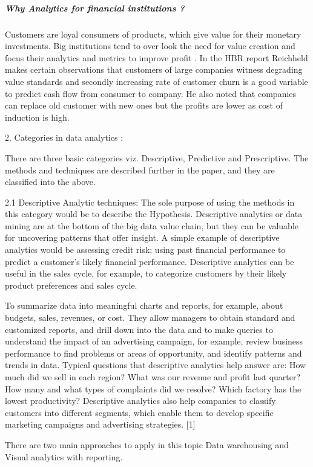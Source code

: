 \subparagraph{Why Analytics for financial institutions ?}
Customers are loyal consumers of products, which give value for their monetary investments. Big institutions tend to over look the need for value creation and focus their analytics and metrics to improve profit . In the HBR report Reichheld makes certain  observations that customers of large companies witness degrading value standards and secondly increasing rate of customer churn is a good variable to predict cash flow from consumer to company. He also noted that companies can replace old customer with new ones but the profits are lower as cost of induction is high.



	

2. Categories in data analytics :

There are three basic categories viz. Descriptive, Predictive and Prescriptive. The methods and techniques are described further in the paper, and they are classified into the above.

2.1 Descriptive Analytic techniques: The sole purpose of using the methods in this category would be to describe the Hypothesis. Descriptive analytics or data mining are at the bottom of the big data value chain, but they can be valuable for uncovering patterns that offer insight. A simple example of descriptive analytics would be assessing credit risk; using past financial performance to predict a customer’s likely financial performance. Descriptive analytics can be useful in the sales cycle, for example, to categorize customers by their likely product preferences and sales cycle.

To summarize data into meaningful charts and reports, for example, about budgets, sales, revenues, or cost. They allow managers to obtain standard and customized reports, and drill down into the data and to make queries to understand the impact of an advertising campaign, for example, review business performance to find problems or areas of opportunity, and identify patterns and trends in data. Typical questions that descriptive analytics help answer are: How much did we sell in each region? What was our revenue and profit last quarter? How many and what types of complaints did we resolve? Which factory has the lowest productivity? Descriptive analytics also help companies to classify customers into different segments, which enable them to develop specific marketing campaigns and advertising strategies. [1]

There are two main approaches to apply in this topic Data warehousing and Visual analytics with reporting.

